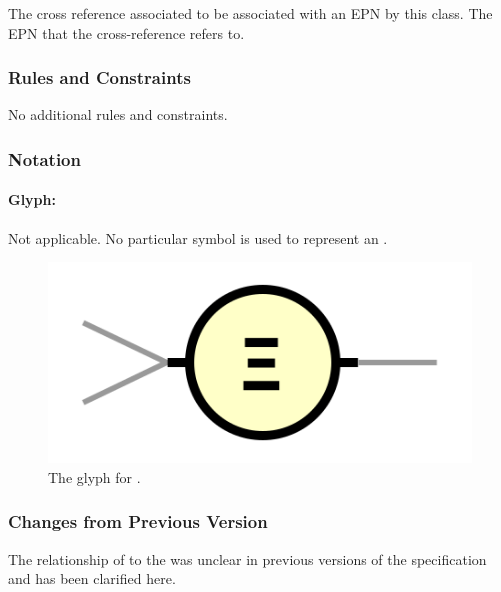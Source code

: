 \begin{attributes}
 The cross reference
associated to be associated with an EPN by this class.
 The EPN that the
cross-reference refers to.
\end{attributes}

\subsubsection{Rules and Constraints}

No additional rules and constraints.

\subsubsection{Notation}

\paragraph{Glyph:  }\label{sec:techref:equivalenceArc}

\begin{glyphDescription}
 \glyphSboTerm Not applicable.
 \glyphEndPoint No particular symbol is used to represent an .
 \end{glyphDescription}

\begin{figure}[htb]
  \centering
  \includegraphics[scale = 0.4]{images/equivalence}
  \caption{The \PD glyph for .}
  \label{fig:techref:equivalence}
\end{figure}

\subsubsection{Changes from Previous Version}

The relationship of  to the
 was unclear in previous versions of the
specification and has been clarified here.

